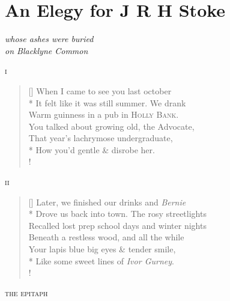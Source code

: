 \documentclass[openany]{amsbook}
\begin{document}
\chapter*{An Elegy for J R H Stoke}

\begin{center}
\textit{whose ashes were buried}\\
\textit{on Blacklyne Common}
\end{center}

\bigskip

\begin{center}
\textsc{i}
\end{center}

\settowidth{\versewidth}{It felt like it was still summer. We drank}
\begin{verse}[\versewidth]
When I came to see you last october\\*
It felt like it was still summer. We drank\\
Warm guinness in a pub in \textsc{Holly Bank}.\\
You talked about growing old, the {\hoskeroe Advocate},\\
That year's lachrymose undergraduate,\\*
How you'd gentle \& disrobe her.\\!
\end{verse}

\bigskip

\begin{center}
\textsc{ii}
\end{center}

\settowidth{\versewidth}{It felt like it was still summer. We drank}
\begin{verse}[\versewidth]
Later, we finished our drinks and \textit{Bernie}\\*
Drove us back into town. The rosy streetlights\\
Recalled lost prep school days and winter nights\\
Beneath a restless wood, and all the while\\
Your lapis blue big eyes \& tender smile,\\*
Like some  sweet lines of \textit{Ivor Gurney}.\\!
\end{verse}

\bigskip

\begin{center}
\textsc{the epitaph}
\end{center}
\end{document}
